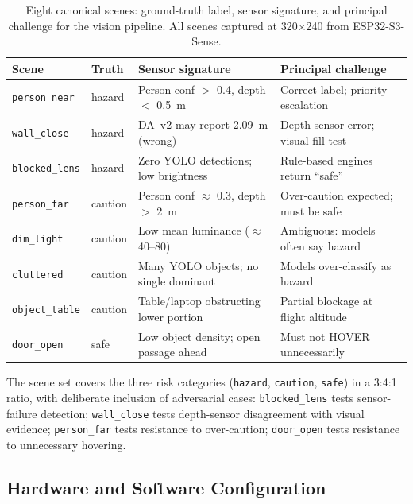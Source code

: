 \begin{table}[ht]
  \caption{Eight canonical scenes: ground-truth label, sensor signature, and principal challenge for the vision pipeline.
  All scenes captured at 320$\times$240 from ESP32-S3-Sense.}
  \label{tab:ch2_scenes}
  \centering
  \small
  \begin{tabular}{llll}
    \toprule
    Scene & Truth & Sensor signature & Principal challenge \\
    \midrule
    \texttt{person\_near}  & hazard  & Person conf $>$ 0.4, depth $<$ 0.5~m & Correct label; priority escalation \\
    \texttt{wall\_close}   & hazard  & DA~v2 may report 2.09~m (wrong)        & Depth sensor error; visual fill test \\
    \texttt{blocked\_lens} & hazard  & Zero YOLO detections; low brightness   & Rule-based engines return ``safe'' \\
    \texttt{person\_far}   & caution & Person conf $\approx$ 0.3, depth $>$ 2~m & Over-caution expected; must be safe \\
    \texttt{dim\_light}    & caution & Low mean luminance ($\approx$40--80)   & Ambiguous: models often say hazard \\
    \texttt{cluttered}     & caution & Many YOLO objects; no single dominant  & Models over-classify as hazard \\
    \texttt{object\_table} & caution & Table/laptop obstructing lower portion & Partial blockage at flight altitude \\
    \texttt{door\_open}    & safe    & Low object density; open passage ahead & Must not HOVER unnecessarily \\
    \bottomrule
  \end{tabular}
\end{table}

\newpage
The scene set covers the three risk categories (\texttt{hazard},
\texttt{caution}, \texttt{safe}) in a 3:4:1 ratio, with deliberate inclusion of adversarial cases: \texttt{blocked\_lens} tests sensor-failure detection; \texttt{wall\_close} tests depth-sensor disagreement with visual evidence; \texttt{person\_far} tests resistance to over-caution; \texttt{door\_open} tests resistance to unnecessary hovering.

\subsection{Hardware and Software Configuration}
\label{sec:ch2_setup_hw}

